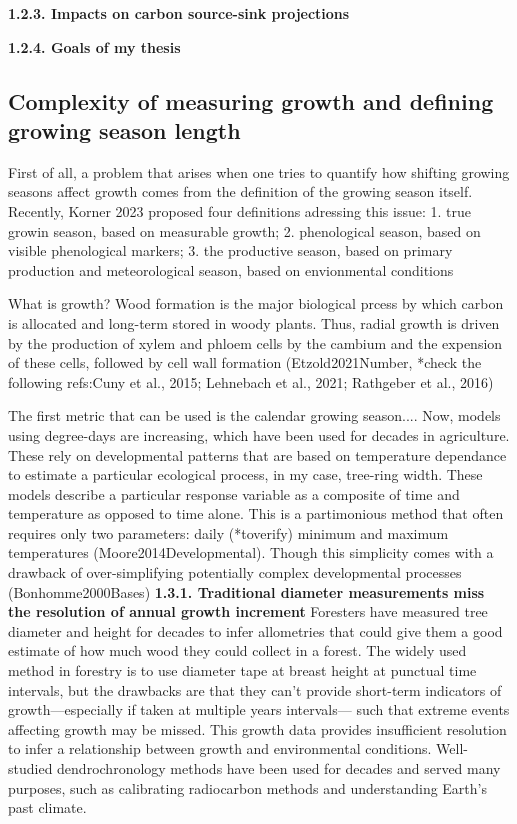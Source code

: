 \documentclass{article}
\begin{document}
\textbf{1.2.3. Impacts on carbon source-sink projections} 

\textbf{1.2.4. Goals of my thesis} 

\subsection{Complexity of measuring growth and defining growing season length}
First of all, a problem that arises when one tries to quantify how shifting growing seasons affect growth comes from the definition of the growing season itself. Recently, Korner 2023 proposed four definitions adressing this issue: 1. true growin season, based on measurable growth; 2. phenological season, based on visible phenological markers; 3. the productive season, based on primary production and meteorological season, based on envionmental conditions %

What is growth? Wood formation is the major biological prcess by which carbon is allocated and long-term stored in woody plants. Thus, radial growth is driven by the production of xylem and phloem cells by the cambium and the expension of these cells, followed by cell wall formation (Etzold2021Number, *check the following refs:Cuny et al., 2015; Lehnebach et al., 2021; Rathgeber et al., 2016)

The first metric that can be used is the calendar growing season.... Now, models using degree-days are increasing, which have been used for decades in agriculture. These rely on developmental patterns that are based on temperature dependance to estimate a particular ecological process, in my case, tree-ring width. These models describe a particular response variable as a composite of time and temperature as opposed to time alone. This is a partimonious method that often requires only two parameters: daily (*toverify) minimum and maximum temperatures (Moore2014Developmental).  Though this simplicity comes with a drawback of over-simplifying potentially complex developmental processes (Bonhomme2000Bases)
\textbf{1.3.1. Traditional diameter measurements miss the resolution of annual growth increment}
Foresters have measured tree diameter and height for decades to infer allometries that could give them a good estimate of how much wood they could collect in a forest. The widely used method in forestry is to use diameter tape at breast height at punctual time intervals, but the drawbacks are that they can't provide short-term indicators of growth---especially if taken at multiple years intervals--- such that extreme events affecting growth may be missed. This growth data provides insufficient resolution to infer a relationship between growth and environmental conditions. Well-studied dendrochronology methods have been used for decades and served many purposes, such as calibrating radiocarbon methods and understanding Earth's past climate. 
\end{document}
